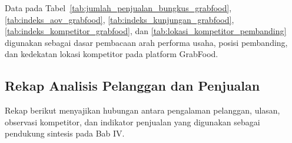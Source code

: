 Data pada Tabel~\ref{tab:jumlah_penjualan_bungkus_grabfood}, \ref{tab:indeks_aov_grabfood}, \ref{tab:indeks_kunjungan_grabfood}, \ref{tab:indeks_kompetitor_grabfood}, dan \ref{tab:lokasi_kompetitor_pembanding} digunakan sebagai dasar pembacaan arah performa usaha, posisi pembanding, dan kedekatan lokasi kompetitor pada platform GrabFood.

\subsection*{Rekap Analisis Pelanggan dan Penjualan}

Rekap berikut menyajikan hubungan antara pengalaman pelanggan, ulasan, observasi kompetitor, dan indikator penjualan yang digunakan sebagai pendukung sintesis pada Bab IV.

\begingroup
    \footnotesize
